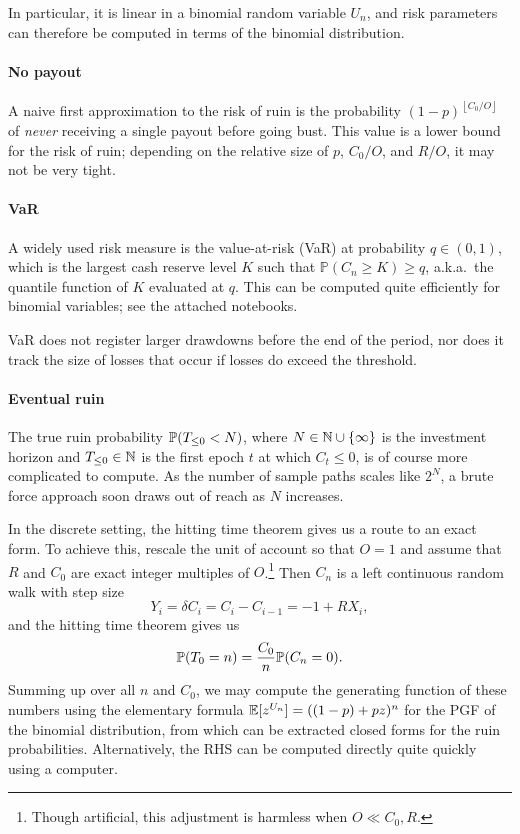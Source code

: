 In particular, it is linear in a binomial random variable $U_n$, and risk parameters can therefore be computed in terms of the binomial distribution.

\paragraph{No payout} A naive first approximation to the risk of ruin is the probability $(1-p)^{\left\lfloor C_0/O \right\rfloor}$ of \emph{never} receiving a single payout before going bust.
  This value is a lower bound for the risk of ruin; depending on the relative size of $p$, $C_0/O$, and $R/O$, it may not be very tight.

\paragraph{VaR} A widely used risk measure is the value-at-risk (VaR) at probability $q\in(0,1)$, which is the largest cash reserve level $K$ such that $\mathbb{P}(C_n\geq K)\geq q$, a.k.a.~the quantile function of $K$ evaluated at $q$.
  This can be computed quite efficiently for binomial variables; see the attached notebooks.
  
  VaR does not register larger drawdowns before the end of the period, nor does it track the size of losses that occur if losses do exceed the threshold.
  
\paragraph{Eventual ruin}
    The true ruin probability $\mathbb{P}(T_{\leq 0}<N)$, where $N\in\mathbb{N}\cup\{\infty\}$ is the investment horizon and $T_{\leq 0}\in\mathbb{N}$ is the first epoch $t$ at which $C_t\leq 0$, is of course more complicated to compute.
    As the number of sample paths scales like $2^N$, a brute force approach soon draws out of reach as $N$ increases.

    In the discrete setting, the hitting time theorem gives us a route to an exact form.
    To achieve this, rescale the unit of account so that $O=1$ and assume that $R$ and $C_0$ are exact integer multiples of $O$.\footnote{Though artificial, this adjustment is harmless when $O\ll C_0,R$.}
    Then $C_n$ is a left continuous random walk with step size
    \[
      Y_i = \delta C_i = C_i - C_{i-1} = - 1 + RX_i,
    \] 
    and the hitting time theorem gives us
    \[
      \mathbb{P}(T_0 = n) = \frac{C_0}{n}\mathbb{P}(C_n = 0).
    \]
    Summing up over all $n$ and $C_0$, we may compute the generating function of these numbers using the elementary formula $\mathbb{E}[z^{U_n}] = ((1-p) + pz)^n$ for the PGF of the binomial distribution, from which can be extracted closed forms for the ruin probabilities.
    Alternatively, the RHS can be computed directly quite quickly using a computer.    

